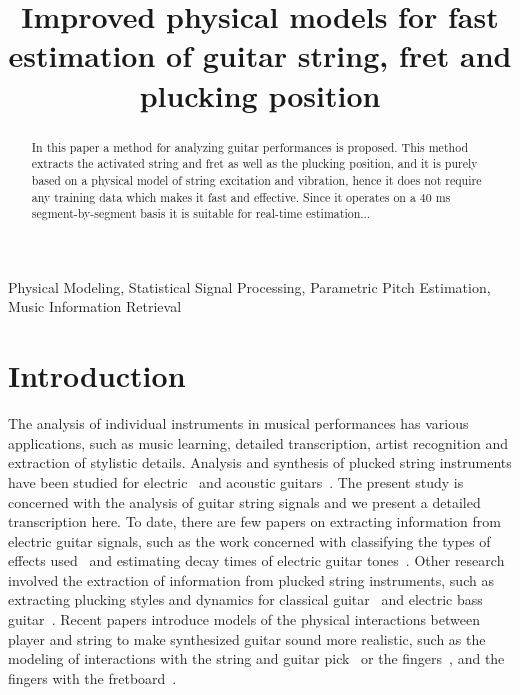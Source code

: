\documentclass{article}
\title{ Improved physical models for fast estimation of guitar string, fret and plucking position}
\begin{document}
\ninept
\maketitle
\begin{sloppy}
\begin{abstract}
  In this paper a method for analyzing guitar performances is proposed. This method extracts the activated string and fret as well as the plucking position, and it is purely based on a physical model of string excitation and vibration, hence it does not require any training data which makes it fast and effective. Since it operates on a 40 ms segment-by-segment basis it is suitable for real-time estimation...
\end{abstract}
%
\begin{keywords}
 Physical Modeling, Statistical Signal Processing, Parametric Pitch Estimation, Music Information Retrieval\vspace{-.8mm}
 \end{keywords}
%
\section{Introduction}
\label{sec:intro}
The analysis of individual instruments in musical performances has various applications, such as music learning, detailed transcription, artist recognition and extraction of stylistic details. Analysis and synthesis of plucked string instruments have been studied for electric~\cite{sullivan1990extending} and acoustic guitars~\cite{Karjalainen93towardshigh-quality,laurson2001methods}. The present study is concerned with the analysis of guitar string signals and we present a detailed transcription here. To date, there are few papers on extracting information from electric guitar signals, such as the work concerned with classifying the types of effects used~\cite{abesser2012feature} and estimating decay times of electric guitar tones~\cite{pate2014predicting}. Other research involved the extraction of information from plucked string instruments, such as extracting plucking styles and dynamics for classical guitar~\cite{erkut2000extraction} and electric bass guitar~\cite{abesser:automatic_string_detection_ml}. Recent papers introduce models of the physical interactions between player and string to make synthesized guitar sound more realistic, such as the modeling of interactions with the string and guitar pick~\cite{germain2009synthesis,evangelista2010player} or the fingers~\cite{poirot_nonlinear_interactions_with_string}, and the fingers with the fretboard~\cite{bilbao2015numerical}. 


\end{sloppy}
\end{document}
